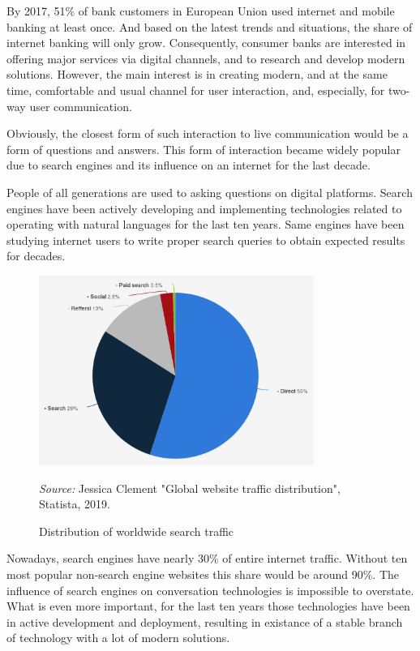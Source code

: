 By 2017, 51\% of bank customers in European Union used internet and mobile banking at least once.
And based on the latest trends and situations, the share of internet banking will only grow.
Consequently, consumer banks are interested in offering major services via digital channels, and to research and develop modern solutions.
However, the main interest is in creating modern, and at the same time, comfortable and usual channel for user interaction, and, especially, for two-way user communication.

Obviously, the closest form of such interaction to live communication would be a form of questions and answers.
This form of interaction became widely popular due to search engines and its influence on an internet for the last decade.

People of all generations are used to asking questions on digital platforms.
Search engines have been actively developing and implementing technologies related to operating with natural languages for the last ten years.
Same engines have been studying internet users to write proper search queries to obtain expected results for decades.

\begin{figure}
    \centering
    \includegraphics[width=0.8\textwidth,height=\textheight,keepaspectratio]{images/statista_search_engines.png}
    \caption{Distribution of worldwide search traffic}
    \medskip
    \footnotesize\textit{Source:} Jessica Clement "Global website traffic distribution", Statista, 2019.
\end{figure}

Nowadays, search engines have nearly 30\% of entire internet traffic.
Without ten most popular non-search engine websites this share would be around 90\%.
The influence of search engines on conversation technologies is impossible to overstate.
What is even more important, for the last ten years those technologies have been in active development and deployment, resulting in existance of a stable branch of technology with a lot of modern solutions.

